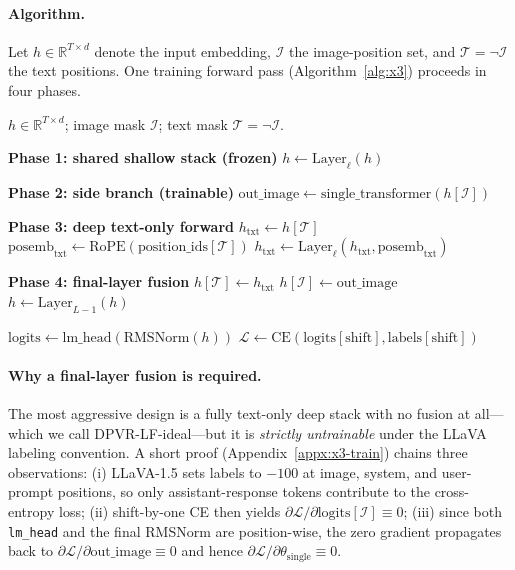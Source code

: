 \documentclass[a4paper,fleqn,review]{cas-sc}
\newcommand{\dpvrlf}{DPVR-LF}
\newcommand{\dpvrlfideal}{DPVR-LF-ideal}
\begin{document}
\paragraph{Algorithm.}
Let $h \in \mathbb{R}^{T \times d}$ denote the input embedding,
$\mathcal{I}$ the image-position set, and $\mathcal{T} =
\neg \mathcal{I}$ the text positions. One training forward pass
(Algorithm~\ref{alg:x3}) proceeds in four phases.

\begin{algorithm}[t]
\caption{\dpvrlf{} forward (training)}\label{alg:x3}
\begin{algorithmic}[1]
\Require $h \in \mathbb{R}^{T \times d}$; image mask $\mathcal{I}$;
         text mask $\mathcal{T} = \neg \mathcal{I}$.

\Statex \textbf{Phase 1: shared shallow stack (frozen)}
 
  \State $h \gets \text{Layer}_\ell(h)$ 
\EndFor

\Statex \textbf{Phase 2: side branch (trainable)}
\State $\text{out\_image} \gets \text{single\_transformer}(h[\mathcal{I}])$

\Statex \textbf{Phase 3: deep text-only forward}
\State $h_\text{txt} \gets h[\mathcal{T}]$
\State $\text{posemb}_\text{txt} \gets \text{RoPE}(\text{position\_ids}[\mathcal{T}])$
 
  \State $h_\text{txt} \gets \text{Layer}_\ell(h_\text{txt}, \text{posemb}_\text{txt})$
\EndFor

\Statex \textbf{Phase 4: final-layer fusion}
\State $h[\mathcal{T}] \gets h_\text{txt}$ 
\State $h[\mathcal{I}] \gets \text{out\_image}$ 
\State $h \gets \text{Layer}_{L-1}(h)$

\State $\text{logits} \gets \text{lm\_head}(\text{RMSNorm}(h))$
\State $\mathcal{L} \gets \text{CE}(\text{logits}[\text{shift}], \text{labels}[\text{shift}])$
\end{algorithmic}
\end{algorithm}

\paragraph{Why a final-layer fusion is required.}
The most aggressive design is a fully text-only deep stack with no
fusion at all---which we call \dpvrlfideal{}---but it is
\emph{strictly untrainable} under the LLaVA labeling convention. A
short proof (Appendix~\ref{appx:x3-train}) chains three observations:
(i) LLaVA-1.5 sets labels to $-100$ at image, system, and
user-prompt positions, so only assistant-response tokens contribute
to the cross-entropy loss; (ii) shift-by-one CE then yields
$\partial \mathcal{L} / \partial \mathrm{logits}[\mathcal{I}]
\equiv 0$; (iii) since both \texttt{lm\_head} and the final RMSNorm
are position-wise, the zero gradient propagates back to
$\partial \mathcal{L} / \partial \mathrm{out\_image} \equiv 0$ and
hence $\partial \mathcal{L} / \partial \theta_{\mathrm{single}}
\equiv 0$.
\end{document}
